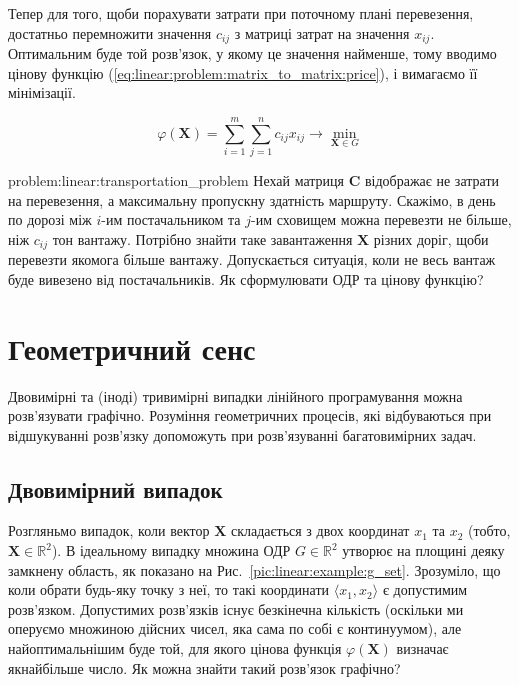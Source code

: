 \documentclass[\main/book.tex]{subfiles}
\begin{document}
Тепер для того, щоби порахувати затрати при поточному плані перевезення, достатньо перемножити значення $c_{ij}$ з матриці затрат на значення $x_{ij}$. Оптимальним буде той розв'язок, у якому це значення найменше, тому вводимо цінову функцію (\ref{eq:linear:problem:matrix_to_matrix:price}), і вимагаємо її мінімізації.

\begin{equation}
 \varphi(\mathbf{X}) =
 \sum_{i=1}^m \sum_{j=1}^n
 c_{ij} x_{ij}
 \rightarrow \min_{\mathbf{X} \in G}
 \label{eq:linear:problem:matrix_to_matrix:price}
\end{equation}

\begin{problem}{problem:linear:transportation_problem}
 Нехай матриця $\mathbf{C}$ відображає не затрати на перевезення, а максимальну пропускну здатність маршруту. Скажімо, в день по дорозі між $i$-им постачальником та $j$-им сховищем можна перевезти не більше, ніж $c_{ij}$ тон вантажу. Потрібно знайти таке завантаження $\mathbf{X}$ різних доріг, щоби перевезти якомога більше вантажу. Допускається ситуація, коли не весь вантаж буде вивезено від постачальників. Як сформулювати ОДР та цінову функцію?
\end{problem}

\section{Геометричний сенс}
\label{section:linear:geometrical}

Двовимірні та (іноді) тривимірні випадки лінійного програмування можна розв'язувати графічно. Розуміння геометричних процесів, які відбуваються при відшукуванні розв'язку допоможуть при розв'язуванні багатовимірних задач.

\subsection{Двовимірний випадок}

Розгляньмо випадок, коли вектор $\mathbf{X}$ складається з двох координат $x_1$ та $x_2$ (тобто, ${\mathbf{X} \in \mathbb{R}^2}$). В ідеальному випадку множина ОДР ${G \in \mathbb{R}^2}$ утворює на площині деяку замкнену область, як показано на Рис.~\ref{pic:linear:example:g_set}. Зрозуміло, що коли обрати будь-яку точку з неї, то такі координати ${\langle x_1, x_2 \rangle}$ є допустимим розв'язком. Допустимих розв'язків існує безкінечна кількість (оскільки ми оперуємо множиною дійсних чисел, яка сама по собі є континуумом), але найоптимальнішим буде той, для якого цінова функція $\varphi(\mathbf{X})$ визначає якнайбільше число. Як можна знайти такий розв'язок графічно?
\end{document}

